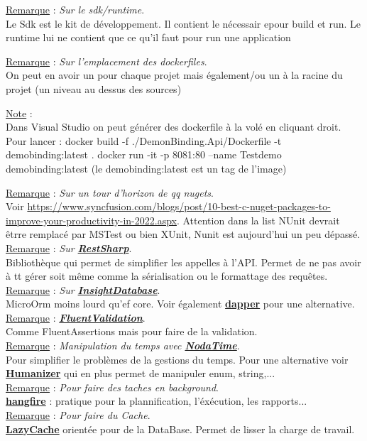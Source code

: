 \documentclass[a4paper,12pt,twoside]{article}
\newcommand{\urlcolor}{magenta}  %
\newcommand{\keycolor}{purple} %
\newcommand{\rem}[2]{\noindent\underline{Remarque} : \textit{#1}.\\ \indent #2}
\newcommand{\note}[1]{\noindent\underline{Note} : \\ \indent #1}
\newcommand{\keyref}[2]{\hypersetup{urlcolor=\keycolor} \href{#1}{\textbf{#2}}\hypersetup{urlcolor=\urlcolor}}
\begin{document}
\rem{Sur le sdk/runtime}{Le Sdk est le kit de développement. Il contient le nécessair epour build et run. Le runtime lui ne contient que ce qu'il faut pour run une application}

\rem{Sur l'emplacement des dockerfiles}{On peut en avoir un pour chaque projet mais également/ou un à la racine du projet (un niveau au dessus des sources)}

\note{Dans Visual Studio on peut générer des dockerfile à la volé en cliquant droit. Pour lancer : docker build  -f ./DemonBinding.Api/Dockerfile -t demobinding:latest .
docker run -it -p 8081:80 --name Testdemo demobinding:latest (le demobinding:latest est un tag de l'image)}

\rem{Sur un tour d'horizon de qq nugets}{Voir \url{https://www.syncfusion.com/blogs/post/10-best-c-nuget-packages-to-improve-your-productivity-in-2022.aspx}. Attention dans la list NUnit devrait êtrre remplacé par MSTest ou bien XUnit, Nunit est aujourd'hui un peu dépassé.}\\

\rem{Sur \keyref{https://restsharp.dev/}{RestSharp}}{Bibliothèque qui permet de simplifier les appelles à l'API. Permet de ne pas avoir à tt gérer soit même comme la sérialisation ou le formattage des requêtes.}\\

\rem{Sur \keyref{https://github.com/jonwagner/Insight.Database/wiki}{InsightDatabase}}{MicroOrm moins lourd qu'ef core. Voir également \keyref{https://github.com/DapperLib/Dapper}{dapper} pour une alternative.}\\

\rem{\keyref{https://docs.fluentvalidation.net/en/latest/}{FluentValidation}}{Comme FluentAssertions mais pour faire de la validation.}\\

\rem{Manipulation du temps avec \keyref{https://nodatime.org/}{NodaTime}}{Pour simplifier le problèmes de la gestions du temps. Pour une alternative voir \keyref{https://github.com/Humanizr/Humanizer}{Humanizer} qui en plus permet de manipuler enum, string,...}\\

\rem{Pour faire des taches en background}{\keyref{https://www.hangfire.io/}{hangfire} : pratique pour la plannification, l'éxécution, les rapports...}\\

\rem{Pour faire du Cache}{\keyref{https://github.com/alastairtree/LazyCache}{LazyCache} orientée pour de la DataBase. Permet de lisser la charge de travail.}\\
\end{document}
